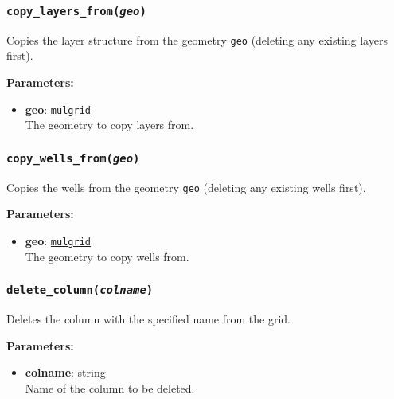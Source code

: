 \begin{snugshade}\subsubsection{\texttt{copy\_layers\_from(\emph{geo})}}\end{snugshade}
\label{sec:mulgrid:copy_layers_from}

Copies the layer structure from the geometry \texttt{geo} (deleting any existing layers first).

\textbf{Parameters:}
\begin{itemize}
\item \textbf{geo}: \hyperref[mulgrids]{\texttt{mulgrid}}\\
  The geometry to copy layers from.
\end{itemize}

\begin{snugshade}\subsubsection{\texttt{copy\_wells\_from(\emph{geo})}}\end{snugshade}
\label{sec:mulgrid:copy_wells_from}

Copies the wells from the geometry \texttt{geo} (deleting any existing wells first).

\textbf{Parameters:}
\begin{itemize}
\item \textbf{geo}: \hyperref[mulgrids]{\texttt{mulgrid}}\\
  The geometry to copy wells from.
\end{itemize}

\begin{snugshade}\subsubsection{\texttt{delete\_column(\emph{colname})}}\end{snugshade}
\label{sec:mulgrid:delete_column}

Deletes the column with the specified name from the grid.

\textbf{Parameters:}
\begin{itemize}
\item \textbf{colname}: string\\
  Name of the column to be deleted.
\end{itemize}

